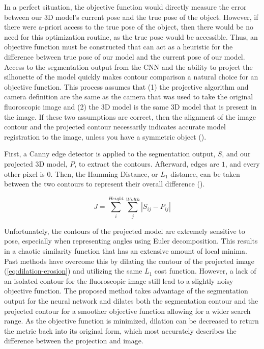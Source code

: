 In a perfect situation, the objective function would directly measure the error between our 3D model's current pose and the true pose of the object.
However, if there were a-priori access to the true pose of the object, then there would be no need for this optimization routine, as the true pose would be accessible.
Thus, an objective function must be constructed that can act as a heuristic for the difference between true pose of our model and the current pose of our model.
Access to the segmentation output from the CNN and the ability to project the silhouette of the model quickly makes contour comparison a natural choice for an objective function.
This process assumes that (1) the projective algorithm and camera definition are the same as the camera that was used to take the original fluoroscopic image and (2) the 3D model is the same 3D model that is present in the image.
If these two assumptions are correct, then the alignment of the image contour and the projected contour necessarily indicates accurate model registration to the image, unless you have a symmetric object ().

First, a Canny edge detector \cite{cannyComputationalApproachEdge1986} is applied to the segmentation output, $S$, and our projected 3D model, $P$, to extract the contours.
Afterward, edges are $1$, and every other pixel is $0$.
Then, the Hamming Distance, or $L_{1}$ distance, can be taken between the two contours to represent their overall difference ().

\begin{equation}
    J = \sum_i^{Height}\sum_j^{Width}|S_{ij} - P_{ij}|
    \label{eq:contour-diff}
\end{equation}

Unfortunately, the contours of the projected model are extremely sensitive to pose, especially when representing angles using Euler decomposition.
This results in a chaotic similarity function that has an extensive amount of local minima.
Past methods have overcome this by dilating the contour of the projected image (\cref{eq:dilation-erosion}) and utilizing the same $L_1$ cost function.
However, a lack of an isolated contour for the fluoroscopic image still lead to a slightly noisy objective function.
The proposed method takes advantage of the segmentation output for the neural network and dilates both the segmentation contour and the projected contour for a smoother objective function allowing for a wider search range.
As the objective function is minimized, dilation can be decreased to return the metric back into its original form, which most accurately describes the difference between the projection and image.

